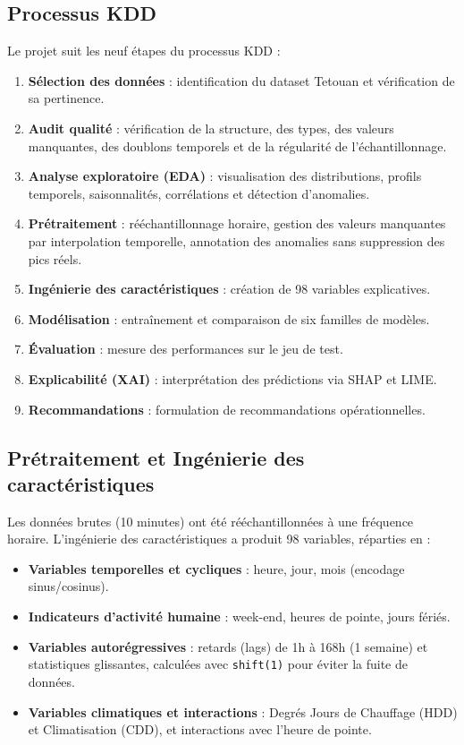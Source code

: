 \documentclass[12pt,a4paper]{article}
\begin{document}
\subsection{Processus KDD}
Le projet suit les neuf étapes du processus KDD :
\begin{enumerate}
    \item \textbf{Sélection des données} : identification du dataset Tetouan et vérification de sa pertinence.
    \item \textbf{Audit qualité} : vérification de la structure, des types, des valeurs manquantes, des doublons temporels et de la régularité de l'échantillonnage.
    \item \textbf{Analyse exploratoire (EDA)} : visualisation des distributions, profils temporels, saisonnalités, corrélations et détection d'anomalies.
    \item \textbf{Prétraitement} : rééchantillonnage horaire, gestion des valeurs manquantes par interpolation temporelle, annotation des anomalies sans suppression des pics réels.
    \item \textbf{Ingénierie des caractéristiques} : création de 98 variables explicatives.
    \item \textbf{Modélisation} : entraînement et comparaison de six familles de modèles.
    \item \textbf{Évaluation} : mesure des performances sur le jeu de test.
    \item \textbf{Explicabilité (XAI)} : interprétation des prédictions via SHAP et LIME.
    \item \textbf{Recommandations} : formulation de recommandations opérationnelles.
\end{enumerate}

\subsection{Prétraitement et Ingénierie des caractéristiques}
Les données brutes (10 minutes) ont été rééchantillonnées à une fréquence horaire.
L'ingénierie des caractéristiques a produit 98 variables, réparties en :
\begin{itemize}
    \item \textbf{Variables temporelles et cycliques} : heure, jour, mois (encodage sinus/cosinus).
    \item \textbf{Indicateurs d'activité humaine} : week-end, heures de pointe, jours fériés.
    \item \textbf{Variables autorégressives} : retards (lags) de 1h à 168h (1 semaine) et statistiques glissantes, calculées avec \texttt{shift(1)} pour éviter la fuite de données.
    \item \textbf{Variables climatiques et interactions} : Degrés Jours de Chauffage (HDD) et Climatisation (CDD), et interactions avec l'heure de pointe.
\end{itemize}
\end{document}
